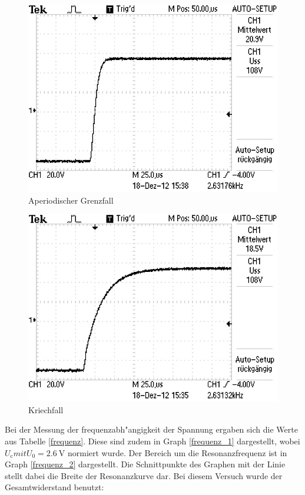 		\begin{figure}[htbp]
			\centering
			\includegraphics[width = 12cm]{img/F0002TEK.jpg}
			\caption{Aperiodischer Grenzfall}
			\label{ap_2}
		\end{figure}

	\begin{figure}[htbp]
		\centering
		\includegraphics[width = 12cm]{img/F0001TEK.jpg}
		\caption{Kriechfall}
		\label{ap_3}
	\end{figure}

	Bei der Messung der frequenzabh"angigkeit der Spannung ergaben sich die Werte aus Tabelle \eqref{frequenz}.
	Diese sind zudem in Graph \eqref{frequenz_1} dargestellt, wobei $U_\mathrm{c} mit U_\mathrm{0} = \SI{2.6}{\volt}$ normiert wurde.
	Der Bereich um die Resonanzfrequenz ist in Graph \eqref{frequenz_2} dargestellt. Die Schnittpunkte des Graphen mit der Linie stellt dabei die Breite der Resonanzkurve dar.
	Bei diesem Versuch wurde der Gesamtwiderstand benutzt:

